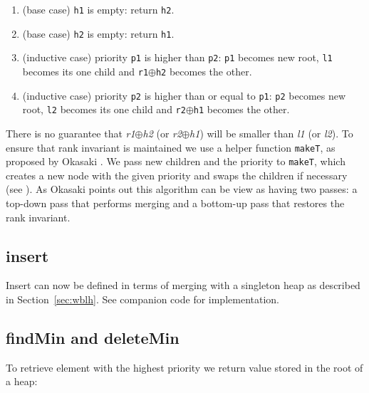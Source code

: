 \begin{enumerate}
 \item (base case) \texttt{h1} is empty: return \texttt{h2}.
 \item (base case) \texttt{h2} is empty: return \texttt{h1}.
 \item (inductive case) priority \texttt{p1} is higher than \texttt{p2}: \texttt{p1} becomes new root, \texttt{l1} becomes its one child and \texttt{r1}$\oplus$\texttt{h2} becomes the other.
 \item (inductive case) priority \texttt{p2} is higher than or equal to \texttt{p1}: \texttt{p2} becomes new root, \texttt{l2} becomes its one child and \texttt{r2}$\oplus$\texttt{h1} becomes the other.
\end{enumerate}
\noindent
There is no guarantee that \textit{r1}$\oplus$\textit{h2} (or \textit{r2}$\oplus$\textit{h1}) will be smaller than \textit{l1} (or \textit{l2}). To ensure that rank invariant is maintained we use a helper function \texttt{makeT}, as proposed by Okasaki \cite{Oka99}. We pass new children and the priority to \texttt{makeT}, which creates a new node with the given priority and swaps the children if necessary (see ). As Okasaki points out this algorithm can be view as having two passes: a top-down pass that performs merging and a bottom-up pass that restores the rank invariant.

\subsection{insert}

Insert can now be defined in terms of merging with a singleton heap as described in Section~\ref{sec:wblh}. See companion code for implementation.

\subsection{findMin and deleteMin}

To retrieve element with the highest priority we return value stored in the root of a heap:

